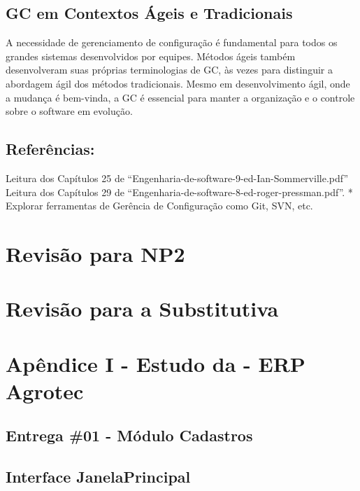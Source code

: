 \documentclass[
]{book}
\begin{document}
\section{GC em Contextos Ágeis e Tradicionais}\label{gc-em-contextos-uxe1geis-e-tradicionais}

A necessidade de gerenciamento de configuração é fundamental para todos os grandes sistemas desenvolvidos por equipes. Métodos ágeis também desenvolveram suas próprias terminologias de GC, às vezes para distinguir a abordagem ágil dos métodos tradicionais. Mesmo em desenvolvimento ágil, onde a mudança é bem-vinda, a GC é essencial para manter a organização e o controle sobre o software em evolução.

\section{Referências:}\label{referuxeancias}

Leitura dos Capítulos 25 de ``Engenharia-de-software-9-ed-Ian-Sommerville.pdf'' Leitura dos Capítulos 29 de ``Engenharia-de-software-8-ed-roger-pressman.pdf''. * Explorar ferramentas de Gerência de Configuração como Git, SVN, etc.

\chapter{Revisão para NP2}\label{revisuxe3o-para-np2}

\chapter{Revisão para a Substitutiva}\label{revisuxe3o-para-a-substitutiva}

\chapter{Apêndice I - Estudo da - ERP Agrotec}\label{apuxeandice-i---estudo-da---erp-agrotec}

\section{Entrega \#01 - Módulo Cadastros}\label{entrega-01---muxf3dulo-cadastros}

\section{Interface JanelaPrincipal}\label{interface-janelaprincipal-1}
\end{document}
